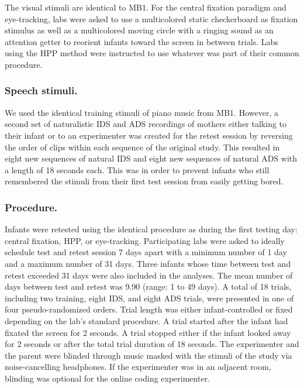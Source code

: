 \documentclass[
  english,
  man,floatsintext]{apa6}
\begin{document}
The visual stimuli are identical to MB1. For the central fixation paradigm and eye-tracking, labs were asked to use a multicolored static checkerboard as fixation stimulus as well as a multicolored moving circle with a ringing sound as an attention getter to reorient infants toward the screen in between trials. Labs using the HPP method were instructed to use whatever was part of their common procedure.

\hypertarget{speech-stimuli.}{%
\subsubsection{Speech stimuli.}\label{speech-stimuli.}}

We used the identical training stimuli of piano music from MB1. However, a second set of naturalistic IDS and ADS recordings of mothers either talking to their infant or to an experimenter was created for the retest session by reversing the order of clips within each sequence of the original study. This resulted in eight new sequences of natural IDS and eight new sequences of natural ADS with a length of 18 seconds each. This was in order to prevent infants who still remembered the stimuli from their first test session from easily getting bored.

\hypertarget{procedure.}{%
\subsubsection{Procedure.}\label{procedure.}}

Infants were retested using the identical procedure as during the first testing day: central fixation, HPP, or eye-tracking. Participating labs were asked to ideally schedule test and retest session 7 days apart with a minimum number of 1 day and a maximum number of 31 days. Three infants whose time between test and retest exceeded 31 days were also included in the analyses. The mean number of days between test and retest was 9.90 (range: 1 to 49 days).
A total of 18 trials, including two training, eight IDS, and eight ADS trials, were presented in one of four pseudo-randomized orders. Trial length was either infant-controlled or fixed depending on the lab's standard procedure. A trial started after the infant had fixated the screen for 2 seconds. A trial stopped either if the infant looked away for 2 seconds or after the total trial duration of 18 seconds. The experimenter and the parent were blinded through music masked with the stimuli of the study via noise-cancelling headphones. If the experimenter was in an adjacent room, blinding was optional for the online coding experimenter.
\end{document}
